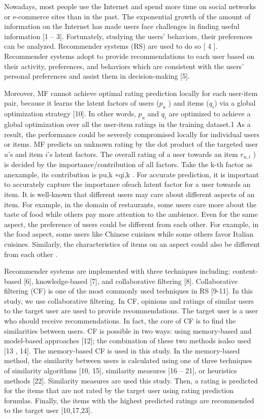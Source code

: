 \documentclass[10pt,conference]{IEEEtran}
\begin{document}
Nowadays, most people use the Internet and spend more time on social networks or e-commerce
sites than in the past. The exponential growth of the amount of information on the Internet has
made users face challenges in finding useful information [1 – 3]. Fortunately, studying the users’
behaviors, their preferences can be analyzed. Recommender systems (RS) are used to do so [ 4 ].
Recommender systems adopt to provide recommendations to each user based on their activity,
preferences, and behaviors which are consistent with the users’ personal preferences and assist them
in decision-making [5].


Moreover, MF cannot achieve optimal rating prediction locally for each user-item pair, because it learns the latent factors of users ($p_u$ ) and items ($q_i$) via a global optimization strategy [10]. In other words, $p_u$ and $q_i$ are optimized to achieve a global optimization over all the user-item ratings in the training dataset.1 As a result, the performance could be severely compromised locally for individual users or items. MF predicts an unknown rating by the dot product of the targeted user $u$'s and item $i$'s latent factors. The overall rating of a user towards an item $r_{u,i}$ ) is decided by the importance/contribution of all factors. Take the k-th factor as anexample, its contribution is pu,k ∗qi,k . For accurate prediction, it is important to accurately capture the importance ofeach latent factor for a user towards an item. It is well-known that different users may care about different aspects of an item. For example, in the domain of restaurants, some users care more about the taste of food while others pay more attention to the ambience. Even for the same aspect, the preference of users could be different from each other. For example, in the food aspect, some users like Chinese cuisines while some others favor Italian cuisines. Similarly, the characteristics of items on an aspect could also be different from each other \cite{}.

Recommender systems are implem​ented with three techniques including: content-based [6], knowledge-based [7], and ​collaborative filtering [8]. Collaborative filtering (CF) is one of the most common​ly used techniques in RS [9-11]. In this study, we use collaborative filtering. In CF, opini​ons and ratings of similar users to the target user are used to provide recommendati​ons. The target user is a user who should receive recommendations. In fact, the core ​of CF is to find the similarities between users. CF is possible in two ways: using memo​ry-based and model-based approaches [12]; the combination of these two methods is​ also used [13 , 14]. The memory-based CF is used in this study. In the memory-based ​method, the similarity between users is calculated using one of three techniques of si​milarity algorithms [10, 15], similarity measures [16 – 21], or heuristics methods [22]. Simil​arity measures are used this study. Then, a rating is predicted for the items that are​ not rated by the target user using rating prediction formulas. Finally, the items with​ the highest predicted ratings are recommended to the target user [10,17,23].
\end{document}
